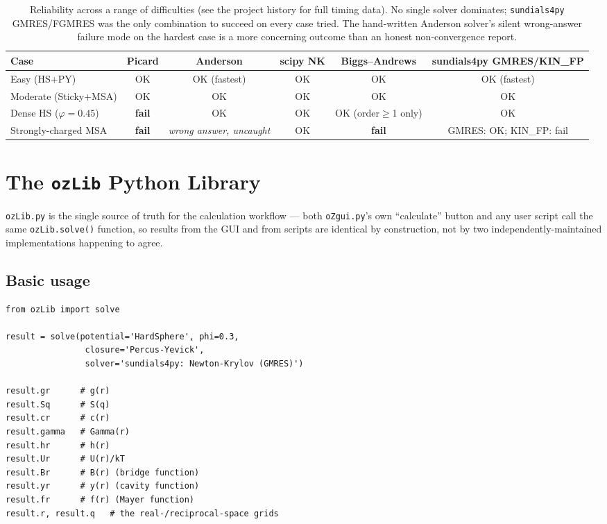 \documentclass[11pt,a4paper]{article}
\newcommand{\code}[1]{\texttt{#1}}
\begin{document}
\begin{table}[h]
\centering
\small
\begin{tabular}{lccccc}
\toprule
Case & Picard & Anderson & scipy NK & Biggs--Andrews & \parbox{2.2cm}{\centering sundials4py GMRES/KIN\_FP} \\
\midrule
Easy (HS+PY) & OK & OK (fastest) & OK & OK & OK (fastest) \\
Moderate (Sticky+MSA) & OK & OK & OK & OK & OK \\
Dense HS ($\varphi{=}0.45$) & \textbf{fail} & OK & OK & OK (order$\ge$1 only) & OK \\
Strongly-charged MSA & \textbf{fail} & \emph{wrong answer, uncaught} & OK & \textbf{fail} & GMRES: OK; KIN\_FP: fail \\
\bottomrule
\end{tabular}
\caption{Reliability across a range of difficulties (see the project history
for full timing data). No single solver dominates; \code{sundials4py} GMRES/FGMRES
was the only combination to succeed on every case tried. The hand-written
Anderson solver's silent wrong-answer failure mode on the hardest case is a
more concerning outcome than an honest non-convergence report.}
\end{table}

\clearpage
\section{The \code{ozLib} Python Library}
\label{sec:ozlib}

\code{ozLib.py} is the single source of truth for the calculation workflow ---
both \code{oZgui.py}'s own ``calculate'' button and any user script call the
same \code{ozLib.solve()} function, so results from the GUI and from scripts
are identical by construction, not by two independently-maintained
implementations happening to agree.

\subsection{Basic usage}
\begin{lstlisting}
from ozLib import solve

result = solve(potential='HardSphere', phi=0.3,
                closure='Percus-Yevick',
                solver='sundials4py: Newton-Krylov (GMRES)')

result.gr      # g(r)
result.Sq      # S(q)
result.cr      # c(r)
result.gamma   # Gamma(r)
result.hr      # h(r)
result.Ur      # U(r)/kT
result.Br      # B(r) (bridge function)
result.yr      # y(r) (cavity function)
result.fr      # f(r) (Mayer function)
result.r, result.q   # the real-/reciprocal-space grids
\end{lstlisting}
\end{document}
